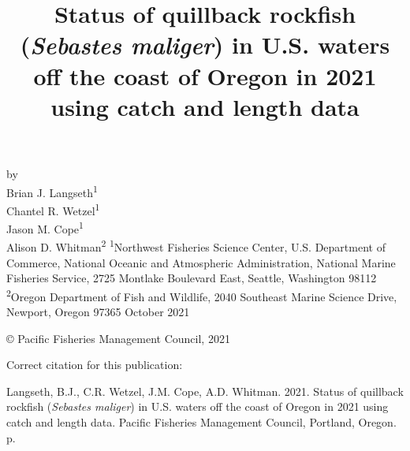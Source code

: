 \documentclass[11pt,
  english,
  a4paper,
]{article}
\date{}
\newcommand{\trTitle}{Status of quillback rockfish (\emph{Sebastes maliger}) in U.S. waters off the coast of Oregon in 2021 using catch and length data}
\newcommand{\trYear}{2021}
\newcommand{\trMonth}{October}
\newcommand{\trAuthsBack}{Langseth, B.J., C.R. Wetzel, J.M. Cope, A.D. Whitman}
\newcommand{\trCitation}{
\begin{hangparas}{1em}{1}
\trAuthsBack{}. \trYear{}. \trTitle{}. Pacific Fisheries Management Council, Portland, Oregon. \pageref{LastPage}{}\,p.
\end{hangparas}}
\begin{document}

\renewcommand*{\thefootnote}{\fnsymbol{footnote}}

\small
\thispagestyle{empty}
\noindent
\begin{center}
\title{Status of quillback rockfish (\emph{Sebastes maliger}) in U.S. waters off the coast of Oregon in 2021 using catch and length data}
\vspace{1.5cm}
{\Large\textbf{}}
\vfill
by\\
Brian J. Langseth\textsuperscript{1}\\
Chantel R. Wetzel\textsuperscript{1}\\
Jason M. Cope\textsuperscript{1}\\
Alison D. Whitman\textsuperscript{2}\vfill
\textsuperscript{1}Northwest Fisheries Science Center, U.S. Department of Commerce, National Oceanic and Atmospheric Administration, National Marine Fisheries Service, 2725 Montlake Boulevard East, Seattle, Washington 98112\\
\textsuperscript{2}Oregon Department of Fish and Wildlife, 2040 Southeast Marine Science Drive, Newport, Oregon 97365\vfill
\trMonth{} \trYear{}
\end{center}
\clearpage

\thispagestyle{empty}
\vspace*{\fill}
\begin{center}
\copyright{} Pacific Fisheries Management Council, \trYear{}\\
\end{center}
\par
\bigskip
\noindent
Correct citation for this publication:
\bigskip
\par
\trCitation{}
\clearpage


\tableofcontents\clearpage
\label{TRlastRoman}
\clearpage

\newpage
\thispagestyle{empty} %

\pagestyle{plain}  %
\renewcommand*{\thefootnote}{\arabic{footnote}}  %
\setcounter{footnote}{0}  %
\renewcommand{\headrulewidth}{0.5pt}
\renewcommand{\footrulewidth}{0.5pt}
\end{document}
